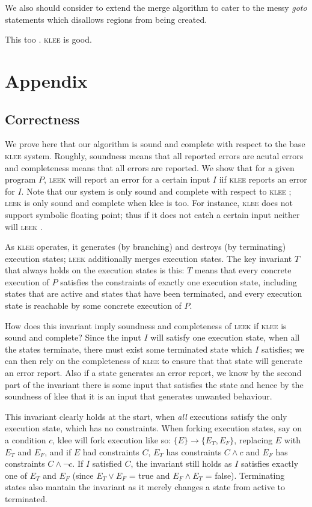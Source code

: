 \documentclass[12pt,a4paper]{article}
\newcommand{\klee}{\textsc{klee }}
\newcommand{\leek}{\textsc{leek }}
\begin{document}
We also should consider to extend the merge algorithm to cater to the messy \emph{goto} statements which disallows regions from being created. 

\cite{lamport94}

This too \cite{boom}. \klee is good.

\section{Appendix}

\subsection{Correctness}

We prove here that our algorithm is sound and complete with respect to the base \klee system. Roughly, soundness means that all reported errors are acutal errors and completeness means that all errors are reported. We show that for a given program $P$, \leek will report an error for a certain input $I$ iif \klee reports an error for $I$. Note that our system is only sound and complete with respect to \klee; \leek is only sound and complete when klee is too. For instance, \klee does not support symbolic floating point; thus if it does not catch a certain input neither will \leek.

As \klee operates, it generates (by branching) and destroys (by terminating) execution states; \leek additionally merges execution states. The key invariant $T$ that always holds on the execution states is this: $T$ means that every concrete execution of $P$ satisfies the constraints of exactly one execution state, including states that are active and states that have been terminated, and every execution state is reachable by some concrete execution of $P$.

How does this invariant imply soundness and completeness of \leek if \klee is sound and complete? Since the input $I$ will satisfy one execution state, when all the states terminate, there must exist some terminated state which $I$ satisfies; we can then rely on the completeness of \klee to ensure that that state will generate an error report. Also if a state generates an error report, we know by the second part of the invariant there is some input that satisfies the state and hence by the soundness of klee that it is an input that generates unwanted behaviour.

This invariant clearly holds at the start, when \emph{all} executions satisfy the only execution state, which has no constraints. When forking execution states, say on a condition $c$, klee will fork execution like so: $\{E\} \rightarrow \{E_T, E_F\}$, replacing $E$ with $E_T$ and $E_F$, and if $E$ had constraints $C$, $E_T$ has constraints $C \wedge c$ and $E_F$ has constraints $C \wedge \neg c$. If $I$ satisfied $C$, the invariant still holds as $I$ satisfies exactly one of $E_T$ and $E_F$ (since $E_T \vee E_F$ = true and $E_F \wedge E_T$ = false). Terminating states also mantain the invariant as it merely changes a state from active to terminated.
\end{document}
